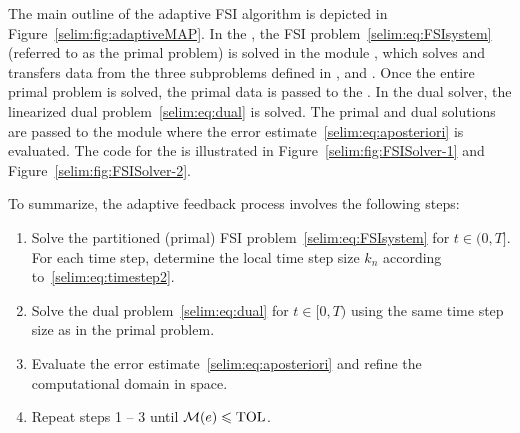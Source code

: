 The main outline of the adaptive FSI algorithm is depicted in
Figure~\ref{selim:fig:adaptiveMAP}. In the , the FSI
problem~\eqref{selim:eq:FSIsystem} (referred to as the primal problem)
is solved in the module , which solves and
transfers data from the three subproblems defined in
,  and . Once
the entire primal problem is solved, the primal data is passed to the
. In the dual solver, the linearized dual
problem~\eqref{selim:eq:dual} is solved. The primal and dual solutions
are passed to the module  where the error
estimate~\eqref{selim:eq:aposteriori} is evaluated. The code for the
 is illustrated in
Figure~\ref{selim:fig:FSISolver-1} and Figure~\ref{selim:fig:FSISolver-2}.


To summarize, the adaptive feedback process involves the following steps:
\begin{enumerate}
\item
Solve the partitioned (primal) FSI problem~\eqref{selim:eq:FSIsystem} for
$t\in(0,T]$. For each time step, determine the local time step size $k_n$
  according to~\eqref{selim:eq:timestep2}.
\item
Solve the dual problem~\eqref{selim:eq:dual} for $t\in[0,T)$ using the
  same time step size as in the primal problem.
\item
Evaluate the error estimate~\eqref{selim:eq:aposteriori} and refine
the computational domain in space.
\item
Repeat steps 1 -- 3 until $\mathcal{M}(e)\leqslant \mathrm{TOL}$.
\end{enumerate}

